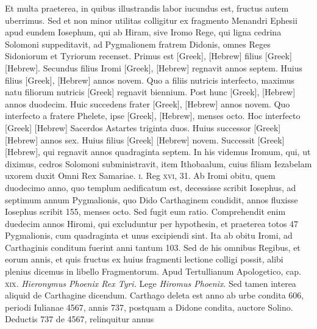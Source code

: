 Et
multa praeterea, in quibus illustrandis labor iucundus est, fructus
autem uberrimus.
Sed et non minor utilitas colligitur ex fragmento
Menandri Ephesii apud eundem Iosephum, qui ab Hiram, sive
Iromo Rege, qui ligna cedrina Solomoni suppeditavit, ad Pygmalionem
fratrem Didonis, omnes Reges Sidoniorum et Tyriorum
recenset.
Primus est \textgreek{[Greek]}, \texthebrew{[Hebrew]}
 filius \textgreek{[Greek]} \texthebrew{[Hebrew]}.
Secundus filius Iromi \textgreek{[Greek]}, \texthebrew{[Hebrew]}
 regnavit annos septem.
Huius filius \textgreek{[Greek]}, \texthebrew{[Hebrew]} annos novem.
Quo a filiis nutricis
interfecto, maximus natu filiorum nutricis \textgreek{[Greek]} regnavit
biennium.
Post hunc \textgreek{[Greek]}, \texthebrew{[Hebrew]} annos
duodecim.
Huic succedens frater \textgreek{[Greek]},
 \texthebrew{[Hebrew]} annos novem.
Quo interfecto a fratere Phelete, ipse
 \textgreek{[Greek]}, \texthebrew{[Hebrew]}, menses octo.
Hoc interfecto \textgreek{[Greek]} \texthebrew{[Hebrew]}
 Sacerdos Astartes triginta
duos.
Huius successor \textgreek{[Greek]} \texthebrew{[Hebrew]} annos sex.
Huius filius
\textgreek{[Greek]} \texthebrew{[Hebrew]} novem.
Successit \textgreek{[Greek]} \texthebrew{[Hebrew]}, qui regnavit
annos quadraginta septem.
In his videmus Iromum, qui, ut
diximus, cedros Solomoni subministravit, item Ithobaalum, cuius
filiam Iezabelam uxorem duxit Omni Rex Samariae. \textsc{i}. Reg \textsc{xvi},
31.
Ab Iromi obitu, quem duodecimo anno, quo templum aedificatum
est, decessisse scribit Iosephus, ad septimum annum Pygmalionis,
quo Dido Carthaginem condidit, annos fluxisse Iosephus
scribit 155, menses octo.
Sed fugit eum ratio.
Comprehendit
enim duedecim annos Hiromi, qui excluduntur per hypothesin,
et praeterea totos 47 Pygmalionis, cum quadraginta et
unus excipiendi sint.
Ita ab obitu Iromi, ad Carthaginis conditum
fuerint anni tantum 103.
Sed de his omnibus Regibus, et
eorum annis, et quis fructus ex huius fragmenti lectione colligi
possit, alibi plenius dicemus in libello Fragmentorum.
Apud Tertullianum Apologetico, cap. \textsc{xix}.
\textit{Hieronymus Phoenix Rex Tyri.}
Lege \textit{Hiromus Phoenix}.
Sed tamen interea aliquid de Carthagine
dicendum.
Carthago deleta est anno ab urbe condita 606,
periodi Iulianae 4567, annis 737, postquam a Didone condita,
auctore Solino.
Deductis 737 de 4567, relinquitur annus
